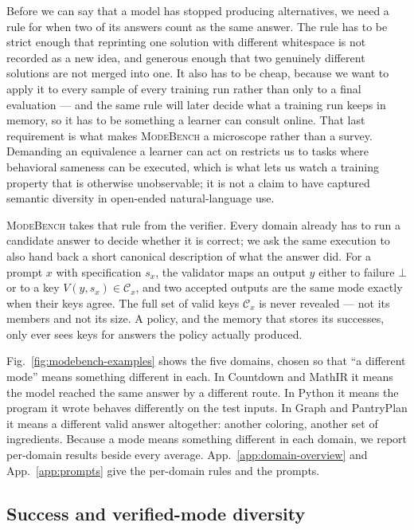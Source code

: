 \documentclass{article}
\newcommand{\1}{\mathbf 1}
\newcommand{\mb}{\textsc{ModeBench}}
\theoremstyle{remark}
\theoremstyle{definition}
\theoremstyle{plain}
\begin{document}
Before we can say that a model has stopped producing alternatives, we need a
rule for when two of its answers count as the same answer. The rule has to be
strict enough that reprinting one solution with different whitespace is not
recorded as a new idea, and generous enough that two genuinely different
solutions are not merged into one. It also has to be cheap, because we want to
apply it to every sample of every training run rather than only to a final
evaluation --- and the same rule will later decide what a training run keeps in
memory, so it has to be something a learner can consult online. That last
requirement is what makes \mb{} a microscope rather than a survey. Demanding an
equivalence a learner can act on restricts us to tasks where behavioral
sameness can be executed, which is what lets us watch a training property that
is otherwise unobservable; it is not a claim to have captured semantic
diversity in open-ended natural-language use.

\mb{} takes that rule from the verifier. Every domain already has to run a
candidate answer to decide whether it is correct; we ask the same execution to
also hand back a short canonical description of what the answer did. For a
prompt $x$ with specification $s_x$, the validator maps an output $y$ either to
failure $\bot$ or to a key $V(y,s_x)\in\mathcal C_x$, and two accepted outputs
are the same mode exactly when their keys agree. The full set of valid keys
$\mathcal C_x$ is never revealed --- not its members and not its size. A policy,
and the memory that stores its successes, only ever sees keys for answers the
policy actually produced.

Fig.~\ref{fig:modebench-examples} shows the five domains, chosen so that ``a
different mode'' means something different in each. In Countdown and MathIR it
means the model reached the same answer by a different route. In Python it means
the program it wrote behaves differently on the test inputs. In Graph and
PantryPlan it means a different valid answer altogether: another coloring,
another set of ingredients. Because a mode means something different in each
domain, we report per-domain results beside every average.
App.~\ref{app:domain-overview} and App.~\ref{app:prompts} give the per-domain
rules and the prompts.

\subsection{Success and verified-mode diversity}
\label{sec:collapse-metrics}
\end{document}
